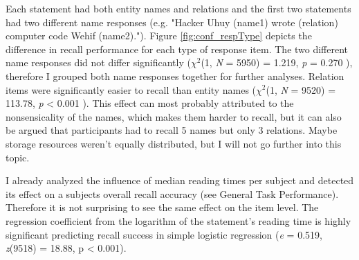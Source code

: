 \documentclass[a4paper,man,natbib,floatsintext,import]{apa6}
\begin{document}
Each statement had both entity names and relations and the first two statements had two different name responses (e.g. "Hacker Uhuy (name1) wrote (relation) computer code Wehif (name2)."). Figure \ref{fig:conf_respType} depicts the difference in recall performance for each type of response item. The two different name responses did not differ significantly (\textit{${\chi}^2$}(1, \textit{N} = 5950) = 1.219, \textit{p} = 0.270 ), therefore I grouped both name responses together for further analyses. Relation items were significantly easier to recall than entity names (\textit{${\chi}^2$}(1, \textit{N} = 9520) = 113.78, \textit{p} < 0.001 ). This effect can most probably attributed to the nonsensicality of the names, which makes them harder to recall, but it can also be argued that participants had to recall 5 names but only 3 relations. Maybe storage resources weren't equally distributed, but I will not go further into this topic.

I already analyzed the influence of median reading times per subject and detected its effect on a subjects overall recall accuracy (see General Task Performance). Therefore it is not surprising to see the same effect on the item level. The regression coefficient from the logarithm of the statement's reading time is highly significant predicting recall success in simple logistic regression (\textit{e} = 0.519, \textit{z}(9518) = 18.88, p < 0.001).
\end{document}
